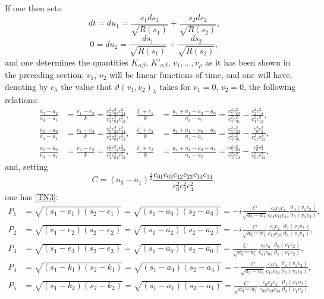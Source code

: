 \documentclass{article}
\newcommand{\tnref}[1]{\hyperlink{#1}{[#1]}}
\begin{document}
If one then sets
\[
dt = du_1 = \frac{s_1ds_1}{\sqrt{R(s_1)}} + \frac{s_2ds_2}{\sqrt{R(s_2)}},
\]
\[
0 = du_2 = \frac{ds_1}{\sqrt{R(s_1)}} + \frac{ds_2}{\sqrt{R(s_2)}},
\]
and one determines the quantities $K_{\alpha\beta}$, $K'_{\alpha\beta}$, $v_1, \ldots, v_\rho$ as it has been shown in the preceding section; $v_1$, $v_2$ will be linear functions of time, and one will have, denoting by $c_\lambda$ the value that $\vartheta(v_1, v_2)_\lambda$ takes for $v_1 = 0$, $v_2 = 0$, the following relations:
\begin{align*}
\frac{a_3 - a_2}{a_4 - a_1} &= \frac{e_1 - e_2}{k} = \frac{c_2^2c_{03}^2c_{34}^2}{c_4^2c_{01}^2c_{12}^2}, & \frac{l_1 + e_1}{k} &= \frac{a_4 + a_1 - a_2 - a_0}{a_4 - a_1} = \frac{c_5^2c_{23}^2}{c_4^2c_{01}^2} - \frac{c_2^2c_{14}^2}{c_4^2c_{12}^2}, \\
\frac{a_3 - a_0}{a_4 - a_1} &= \frac{e_1 - e_3}{k} = \frac{c_0^2c_{23}^2c_{34}^2}{c_4^2c_{01}^2c_{12}^2}, & \frac{l_1 + e_2}{k} &= \frac{a_4 + a_1 - a_0 - a_3}{a_4 - a_1} = \frac{c_5^2c_{23}^2}{c_4^2c_{01}^2} - \frac{c_0^2c_2^2}{c_{01}^2c_{12}^2}, \\
\frac{a_2 - a_0}{a_4 - a_1} &= \frac{e_2 - e_3}{k} = \frac{c_5^2c_{14}^2c_{34}^2}{c_4^2c_{01}^2c_{12}^2}, & \frac{l_1 + e_3}{k} &= \frac{a_4 + a_1 - a_3 - a_2}{a_4 - a_2} = \frac{c_5^2c_{03}^2}{c_4^2c_{12}^2} - \frac{c_0^2c_2^2}{c_{01}^2c_{12}^2},
\end{align*}
and, setting
\[
C = (a_3 - a_1)^{\frac{3}{2}}\frac{c_{01}c_{03}c_{12}c_{23}c_{14}c_{34}}{c_0^2c_2^2c_4^2},
\]
one has \hypertarget{TN3-ref}{}\tnref{TN3}:
\begin{align*}
P_1 &= \sqrt{(s_1 - e_1)(s_2 - e_1)} = \sqrt{(s_1 - a_3)(s_2 - a_3)} = -i\frac{C}{\sqrt{a_3 - a_1}}\frac{c_0c_2c_4}{c_{01}c_{12}c_{14}}\frac{\vartheta_3(v_1v_2)}{\vartheta_5(v_1v_2)}, \\
P_2 &= \sqrt{(s_1 - e_2)(s_2 - e_2)} = \sqrt{(s_1 - a_2)(s_2 - a_2)} = -i\frac{C}{\sqrt{a_3 - a_1}}\frac{c_5c_2}{c_{12}c_{23}}\frac{\vartheta_2(v_1v_2)}{\vartheta_5(v_1v_2)}, \\
P_3 &= \sqrt{(s_1 - e_3)(s_2 - e_3)} = \sqrt{(s_1 - a_0)(s_2 - a_0)} = \frac{C}{\sqrt{a_3 - a_1}}\frac{c_5c_0}{c_{01}c_{03}}\frac{\vartheta_0(v_1v_2)}{\vartheta_5(v_1v_2)}, \\
P_4 &= \sqrt{(s_1 - k_1)(s_2 - k_1)} = \sqrt{(s_1 - a_4)(s_2 - a_4)} = -\frac{C}{\sqrt{a_3 - a_1}}\frac{c_5c_4}{c_{14}c_{34}}\frac{\vartheta_4(v_1v_2)}{\vartheta_5(v_1v_2)}, \\
P_5 &= \sqrt{(s_1 - k_2)(s_2 - k_2)} = \sqrt{(s_1 - a_1)(s_2 - a_1)} = \frac{C}{\sqrt{a_3 - a_1}}\frac{c_0c_2c_4}{c_{03}c_{23}c_{34}}\frac{\vartheta_1(v_1v_2)}{\vartheta_5(v_1v_2)}.
\end{align*}
\end{document}

